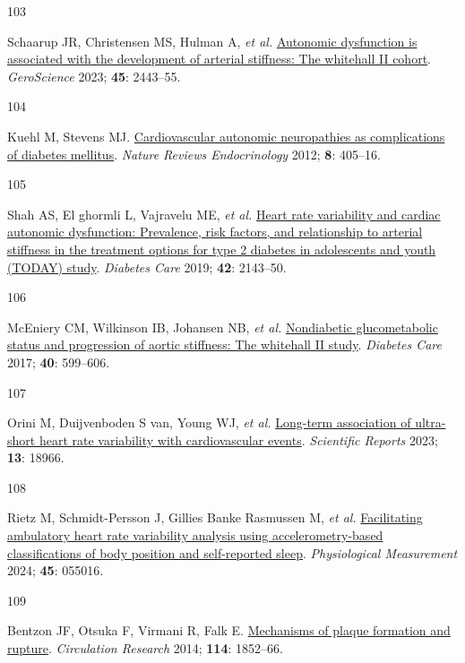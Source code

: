 \documentclass[
  letterpaper,
  headsepline=true,
  open=any]{scrbook}
\newlength{\cslhangindent}
\newlength{\csllabelwidth}
\newlength{\cslentryspacingunit} %
\newenvironment{CSLReferences}[2] %
 {%
  \setlength{\parindent}{0pt}
  \ifodd #1
  \let\oldpar\par
  \def\par{\hangindent=\cslhangindent\oldpar}
  \fi
  \setlength{\parskip}{#2\cslentryspacingunit}
 }%
 {}
\newcommand{\CSLLeftMargin}[1]{\parbox[t]{\csllabelwidth}{#1}}
\newcommand{\CSLRightInline}[1]{\parbox[t]{\linewidth - \csllabelwidth}{#1}\break}
\begin{document}
\begin{CSLReferences}{0}{0}
\leavevmode{}%
\CSLLeftMargin{103 }%
\CSLRightInline{Schaarup JR, Christensen MS, Hulman A, \emph{et al.}
\href{https://doi.org/10.1007/s11357-023-00762-0}{Autonomic dysfunction
is associated with the development of arterial stiffness: The whitehall
II cohort}. \emph{GeroScience} 2023; \textbf{45}: 2443--55.}

\leavevmode{}%
\CSLLeftMargin{104 }%
\CSLRightInline{Kuehl M, Stevens MJ.
\href{https://doi.org/10.1038/nrendo.2012.21}{Cardiovascular autonomic
neuropathies as complications of diabetes mellitus}. \emph{Nature
Reviews Endocrinology} 2012; \textbf{8}: 405--16.}

\leavevmode{}%
\CSLLeftMargin{105 }%
\CSLRightInline{Shah AS, El ghormli L, Vajravelu ME, \emph{et al.}
\href{https://doi.org/10.2337/dc19-0993}{Heart rate variability and
cardiac autonomic dysfunction: Prevalence, risk factors, and
relationship to arterial stiffness in the treatment options for type 2
diabetes in adolescents and youth (TODAY) study}. \emph{Diabetes Care}
2019; \textbf{42}: 2143--50.}

\leavevmode{}%
\CSLLeftMargin{106 }%
\CSLRightInline{McEniery CM, Wilkinson IB, Johansen NB, \emph{et al.}
\href{https://doi.org/10.2337/dc16-1773}{Nondiabetic glucometabolic
status and progression of aortic stiffness: The whitehall II study}.
\emph{Diabetes Care} 2017; \textbf{40}: 599--606.}

\leavevmode{}%
\CSLLeftMargin{107 }%
\CSLRightInline{Orini M, Duijvenboden S van, Young WJ, \emph{et al.}
\href{https://doi.org/10.1038/s41598-023-45988-2}{Long-term association
of ultra-short heart rate variability with cardiovascular events}.
\emph{Scientific Reports} 2023; \textbf{13}: 18966.}

\leavevmode{}%
\CSLLeftMargin{108 }%
\CSLRightInline{Rietz M, Schmidt-Persson J, Gillies Banke Rasmussen M,
\emph{et al.}
\href{https://doi.org/10.1088/1361-6579/ad450d}{Facilitating ambulatory
heart rate variability analysis using accelerometry-based
classifications of body position and self-reported sleep}.
\emph{Physiological Measurement} 2024; \textbf{45}: 055016.}

\leavevmode{}%
\CSLLeftMargin{109 }%
\CSLRightInline{Bentzon JF, Otsuka F, Virmani R, Falk E.
\href{https://doi.org/10.1161/CIRCRESAHA.114.302721}{Mechanisms of
plaque formation and rupture}. \emph{Circulation Research} 2014;
\textbf{114}: 1852--66.}


\end{CSLReferences}
\end{document}

